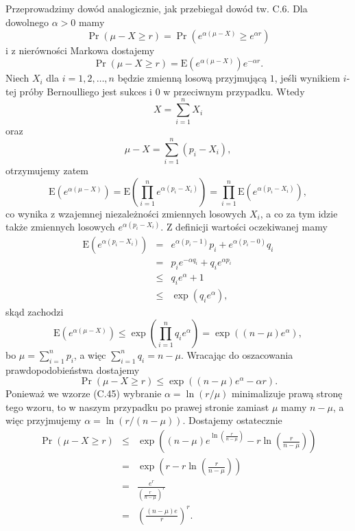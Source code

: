 \subsection{} %
Przeprowadzimy dowód analogicznie, jak przebiegał dowód tw. C.6. Dla dowolnego $\alpha>0$ mamy
\[
	\Pr(\mu-X\ge r) = \Pr\left(e^{\alpha(\mu-X)}\ge e^{\alpha r}\right)
\]
i z nierówności Markowa dostajemy
\[
	\Pr(\mu-X\ge r) = \mathrm{E}\left(e^{\alpha(\mu-X)}\right)e^{-\alpha r}.
\]
Niech $X_i$ dla $i=1,2,\dots,n$ będzie zmienną losową przyjmującą $1$, jeśli wynikiem $i$-tej próby Bernoulliego jest sukces i $0$ w przeciwnym przypadku. Wtedy
\[
	X = \sum_{i=1}^nX_i
\]
oraz
\[
	\mu-X = \sum_{i=1}^n(p_i-X_i),
\]
otrzymujemy zatem
\[
	\mathrm{E}\left(e^{\alpha(\mu-X)}\right) = \mathrm{E}\left(\prod_{i=1}^ne^{\alpha(p_i-X_i)}\right) = \prod_{i=1}^n\mathrm{E}\left(e^{\alpha(p_i-X_i)}\right),
\]
co wynika z wzajemnej niezależności zmiennych losowych $X_i$, a co za tym idzie także zmiennych losowych $e^{\alpha(p_i-X_i)}$. Z definicji wartości oczekiwanej mamy
\begin{eqnarray*}
	\mathrm{E}\left(e^{\alpha(p_i-X_i)}\right) &=& e^{\alpha(p_i-1)}p_i+e^{\alpha(p_i-0)}q_i \\
	&=& p_ie^{-\alpha q_i}+q_ie^{\alpha p_i} \\
	&\le& q_ie^{\alpha}+1 \\
	&\le& \exp(q_ie^\alpha),
\end{eqnarray*}
skąd zachodzi
\[
	\mathrm{E}\left(e^{\alpha(\mu-X)}\right)\le\exp\left(\prod_{i=1}^nq_ie^\alpha\right) = \exp((n-\mu)e^\alpha),
\]
bo $\mu=\sum_{i=1}^np_i$, a więc $\sum_{i=1}^nq_i=n-\mu$. Wracając do oszacowania prawdopodobieństwa dostajemy
\[
	\Pr(\mu-X\ge r)\le\exp((n-\mu)e^\alpha-\alpha r).
\]
Ponieważ we wzorze (C.45) wybranie $\alpha=\ln(r/\mu)$ minimalizuje prawą stronę tego wzoru, to w naszym przypadku po prawej stronie zamiast $\mu$ mamy $n-\mu$, a więc przyjmujemy $\alpha=\ln(r/(n-\mu))$. Dostajemy ostatecznie
\begin{eqnarray*}
	\Pr(\mu-X\ge r) &\le& \exp\left((n-\mu)e^{\ln\left(\frac{r}{n-\mu}\right)}-r\ln\left(\frac{r}{n-\mu}\right)\right) \\
	&=& \exp\left(r-r\ln\left(\frac{r}{n-\mu}\right)\right) \\
	&=& \frac{e^r}{\left(\frac{r}{n-\mu}\right)^r} \\
	&=& \left(\frac{(n-\mu)e}{r}\right)^r.
\end{eqnarray*}

\subsection{} %
